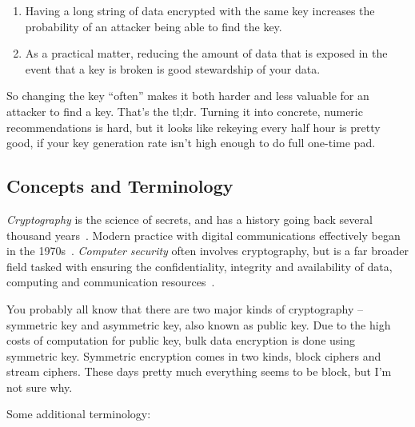 \begin{enumerate}
\item Having a long string of data encrypted with the same key increases
the probability of an attacker being able to find the key.
\item As a practical matter, reducing the amount of data that is exposed
in the event that a key is broken is good stewardship of your data.
\end{enumerate}

So changing the key ``often'' makes it both harder and less valuable
for an attacker to find a key.  That's the tl;dr.  Turning it into
concrete, numeric recommendations is hard, but it looks like rekeying
every half hour is pretty good, if your key generation rate isn't high
enough to do full one-time pad.

\subsection{Concepts and Terminology}

\emph{Cryptography} is the science of secrets, and has a history going
back several thousand years~\cite{kahn1996codebreakers,singh1999code}.
Modern practice with digital communications effectively began in the
1970s~\cite{schneier96:_applied_crypto,menezes1996handbook}.
\emph{Computer security} often involves cryptography, but is a far
broader field tasked with ensuring the confidentiality, integrity and
availability of data, computing and communication
resources~\cite{bishop2002art}.

You probably all know that there are two major kinds of cryptography
-- symmetric key and asymmetric key, also known as public key.  Due to
the high costs of computation for public key, bulk data encryption is
done using symmetric key.  Symmetric encryption comes in two kinds,
block ciphers and stream ciphers.  These days pretty much everything
seems to be block, but I'm not sure why.

Some additional terminology:

